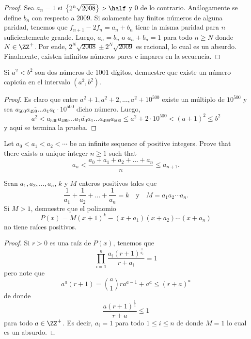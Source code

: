 \begin{proof}
	Sea $a_n=1$ si $\left\{2^n\sqrt{2008}\right\}>\half$ y $0$ de lo contrario. Análogamente se define $b_n$ con respecto a $2009$. Si solamente hay finitos números de alguna paridad, tenemos que $f_{n+1}-2f_n=a_n+b_n$ tiene la misma paridad para $n$ suficientemente grande. Luego, $a_n=b_n$ o $a_n+b_n=1$ para todo $n\ge N$ donde $N\in\ZZ^+$. Por ende, $2^N\sqrt{2008}\pm2^N\sqrt{2009}$ es racional, lo cual es un absurdo. Finalmente, existen infinitos números pares e impares en la secuencia.
\end{proof}

\begin{probEG}
	Si $a^2<b^2$ son dos números de $1001$ dígitos, demuestre que existe un número capicúa en el intervalo $(a^2,b^2)$.
\end{probEG}

\begin{proof}
	Es claro que entre $a^2+1,a^2+2,\dots,a^2+10^{500}$ existe un múltiplo de $10^{500}$ y sea $\overline{a_{500}a_{499}\dots a_1a_0}\cdot 10^{500}$ dicho número. Luego,
	\[a^2<\overline{a_{500}a_{499}\dots a_1a_0a_1\dots a_{499}a_{500}}\le a^2+2\cdot 10^{500}<(a+1)^2\le b^2\]
	y aquí se termina la prueba.
\end{proof}

\begin{probEG}[IMO 2014/1]
	Let $a_0<a_1<a_2<\cdots$ be an infinite sequence of positive integers. Prove that there exists a unique integer $n\ge 1$ such that
	\[a_n<\frac{a_0+a_1+a_2+\dots+a_n}{n}\le a_{n+1}.\]
\end{probEG}

\begin{probEG}
	Sean $a_1,a_2,\dots,a_n$, $k$ y $M$ enteros positivos tales que
	\[\frac{1}{a_1}+\frac{1}{a_2}+\dots+\frac{1}{a_n}=k\quad\text{y}\quad M=a_1a_2\cdots a_n.\]
	Si $M>1$, demuestre que el polinomio
	\[P(x)=M(x+1)^k-(x+a_1)(x+a_2)\cdots(x+a_n)\]
	no tiene raíces positivos.
\end{probEG}

\begin{proof}
	Si $r>0$ es una raíz de $P(x)$, tenemos que
	\[\prod_{i=1}^n\frac{a_i(r+1)^\frac{1}{a_i}}{r+a_i}=1\]
	pero note que
	\[a^a(r+1)=\binom{a}{1}ra^{a-1}+a^a\le(r+a)^a\]
	de donde
	\[\frac{a(r+1)^\frac{1}{a}}{r+a}\le 1\]
	para todo $a\in\ZZ^+$. Es decir, $a_i=1$ para todo $1\le i\le n$ de donde $M=1$ lo cual es un absurdo.
\end{proof}

